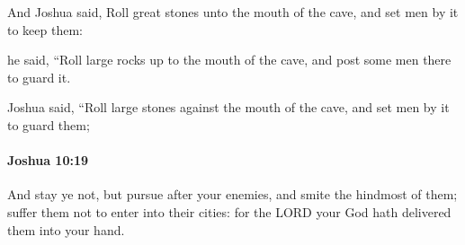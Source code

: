 			\begin{versebox}
					\item[BHS] 
					\item[ASV] And Joshua said, Roll great stones unto the mouth of the cave, and set men by it to keep them:
					\item[NIV] he said, “Roll large rocks up to the mouth of the cave, and post some men there to guard it.
					\item[NRSV] Joshua said, “Roll large stones against the mouth of the cave, and set men by it to guard them;
			\end{versebox}

		\paragraph{Joshua 10:19} %
			\label{JOSHUA-10-19}

			And stay ye not, but pursue after your enemies, and smite the hindmost of them; suffer them not to enter into their cities: for the LORD your God hath delivered them into your hand.


